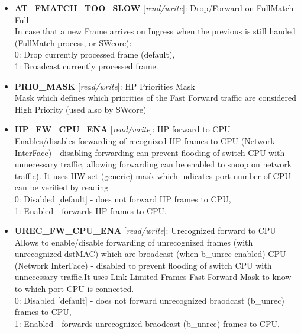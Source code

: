 \begin{itemize}
\begin{small}
\end{small}
\item \begin{small}
{\bf 
AT\_FMATCH\_TOO\_SLOW
} [\emph{read/write}]: Drop/Forward on FullMatch Full
\\
In case that a new Frame arrives on Ingress when the previous is still handed (FullMatch process, or SWcore):\\                 0: Drop currently processed frame (default),\\                 1: Broadcast currently processed frame.
\end{small}
\item \begin{small}
{\bf 
PRIO\_MASK
} [\emph{read/write}]: HP Priorities Mask
\\
Mask which defines which priorities of the Fast Forward traffic are considered High Priority (used also by SWcore)
\end{small}
\item \begin{small}
{\bf 
HP\_FW\_CPU\_ENA
} [\emph{read/write}]: HP forward to CPU
\\
Enables/disables forwarding of recognized HP frames to CPU (Network InterFace) - disabling forwarding can prevent flooding of switch CPU with unnecessary traffic, allowing forwarding can be enabled to snoop on network traffic). It uses HW-set (generic) mask which indicates port number of CPU - can be verified by reading\\                 0: Disabled [default] - does not forward HP frames to CPU,\\                 1: Enabled  - forwards HP frames to CPU.
\end{small}
\item \begin{small}
{\bf 
UREC\_FW\_CPU\_ENA
} [\emph{read/write}]: Urecognized forward to CPU
\\
Allows to enable/disable forwarding of unrecognized frames (with unrecognized dstMAC) which are broadcast (when b\_unrec enabled) CPU (Network InterFace) - disabled to prevent flooding of switch CPU with unnecessary traffic.It uses Link-Limited Frames Fast Forward Mask to know to which port CPU is connected.\\                 0: Disabled [default] - does not forward unrecognized braodcast (b\_unrec) frames to CPU,\\                 1: Enabled  - forwards unrecognized braodcast (b\_unrec) frames to CPU.

\end{small}
\end{itemize}
